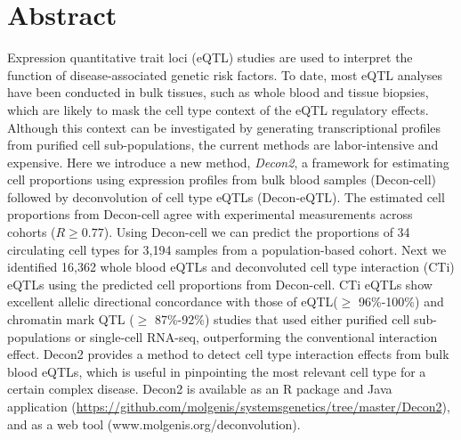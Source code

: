 { \Large {} }

\section*{Abstract}

Expression quantitative trait loci (eQTL) studies are used to interpret the function of disease-associated genetic risk factors. To date, most eQTL analyses have been conducted in bulk tissues, such as whole blood and tissue biopsies, which are likely to mask the cell type context of the eQTL regulatory effects. Although this context can be investigated by generating transcriptional profiles from purified cell sub-populations, the current methods are labor-intensive and expensive. Here we introduce a new method, \textit{Decon2}, a framework for estimating cell proportions using expression profiles from bulk blood samples (Decon-cell) followed by deconvolution of cell type eQTLs (Decon-eQTL). The estimated cell proportions from Decon-cell agree with experimental measurements across cohorts ($R \geq 0.77$). Using Decon-cell we can predict the proportions of 34 circulating cell types for 3,194 samples from a population-based cohort. Next we identified 16,362 whole blood eQTLs and deconvoluted cell type interaction (CTi) eQTLs using the predicted cell proportions from Decon-cell. CTi eQTLs show excellent allelic directional concordance with those of eQTL($\geq$ 96\%-100\%) and chromatin mark QTL ($\geq$ 87\%-92\%) studies that used either purified cell sub-populations or single-cell RNA-seq, outperforming the conventional interaction effect. Decon2 provides a method to detect cell type interaction effects from bulk blood eQTLs, which is useful in pinpointing the most relevant cell type for a certain complex disease. Decon2 is available as an R package and Java application (\url{https://github.com/molgenis/systemsgenetics/tree/master/Decon2}), and as a web tool (www.molgenis.org/deconvolution).


